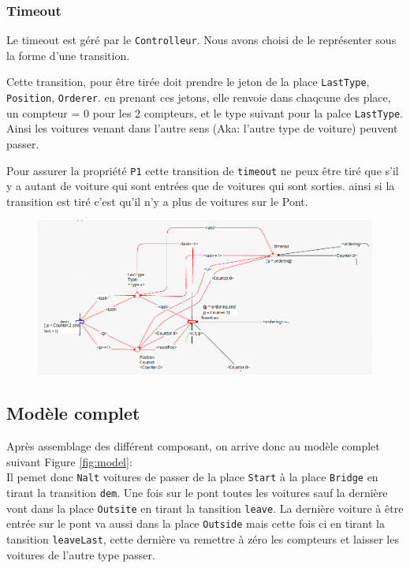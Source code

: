 \subsubsection{Timeout}
Le timeout est géré par le \texttt{Controlleur}. Nous avons choisi de le représenter sous la forme d'une transition.

Cette transition, pour être tirée doit prendre le jeton de la place \texttt{LastType}, \texttt{Position}, \texttt{Orderer}. en prenant ces jetons, elle renvoie dans chaqcune des place, un compteur = 0 pour les 2 compteurs, et le type suivant pour la palce \texttt{LastType}. Ainsi les voitures venant dans l'autre sens (Aka: l'autre type de voiture) peuvent passer.

Pour assurer la propriété \texttt{P1} cette transition de \texttt{timeout} ne peux être tiré que s'il y a autant de voiture qui sont entrées que de voitures qui sont sorties. ainsi si la transition est tiré c'est qu'il n'y a plus de voitures sur le Pont.

\begin{figure}[ht]
    \centering
    \includegraphics[scale=0.5]{figures/ctrl.jpeg}
    \label{fig:ctrl}
\end{figure}

\newpage

\subsection{Modèle complet} %
Après assemblage des différent composant, on arrive donc au modèle complet suivant Figure \ref{fig:model}:\\

Il pemet donc \texttt{Nalt} voitures de passer de la place \texttt{Start} à la place \texttt{Bridge} en tirant la transition \texttt{dem}. Une fois sur le pont toutes les voitures sauf la dernière vont dans la place \texttt{Outsite} en tirant la tansition \texttt{leave}. La dernière voiture à être entrée sur le pont va aussi dans la place \texttt{Outside} mais cette fois ci en tirant la tansition \texttt{leaveLast}, cette dernière va remettre à zéro les compteurs et laisser les voitures de l'autre type passer.\\

